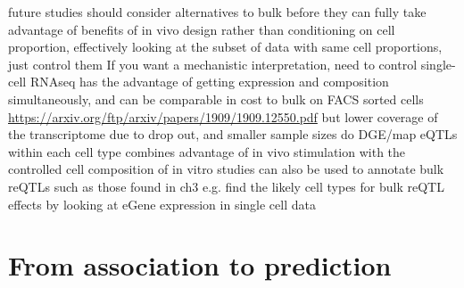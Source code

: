 \begin{outline}
\1 future studies should consider alternatives to bulk before they can fully take advantage of benefits of in vivo design
    \2 rather than conditioning on cell proportion, effectively looking at the subset of data with same cell proportions, just control them
    \2 If you want a mechanistic interpretation, need to control
    \2 single-cell RNAseq has the advantage of getting expression and composition simultaneously, and can be comparable in cost to bulk on FACS sorted cells \url{https://arxiv.org/ftp/arxiv/papers/1909/1909.12550.pdf}
        \3 but lower coverage of the transcriptome due to drop out, and smaller sample sizes
    \2 do DGE/map eQTLs within each cell type 
        \3 combines advantage of in vivo stimulation with the controlled cell composition of in vitro studies
    \2 can also be used to annotate bulk reQTLs such as those found in ch3 e.g. find the likely cell types for bulk reQTL effects by looking at eGene expression in single cell data \autocite{devries2020IntegratingGWASBulk}

%
%
%
%

\section{From association to prediction}


\end{outline}
